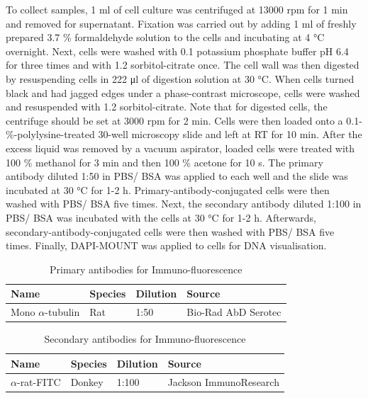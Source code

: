 To collect samples, 1 \si{\milli\litre} of cell culture was centrifuged at 13000 rpm for 1 \si{\minute} and removed for supernatant. Fixation was carried out by adding 1 \si{\milli\litre} of freshly prepared 3.7 \% formaldehyde solution to the cells and incubating at 4 \si{\celsius} overnight. Next, cells were washed with 0.1 \si{\Molar} potassium phosphate buffer pH 6.4 for three times and with 1.2 \si{\Molar} sorbitol-citrate once. The cell wall was then digested by resuspending cells in 222 \si{\micro\litre} of digestion solution at 30 \si{\celsius}. When cells turned black and had jagged edges under a phase-contrast microscope, cells were washed and resuspended with 1.2 \si{\Molar} sorbitol-citrate. Note that for digested cells, the centrifuge should be set at 3000 rpm for 2 \si{\minute}. Cells were then loaded onto a 0.1-\%-polylysine-treated 30-well microscopy slide and left at RT for 10 \si{\minute}. After the excess liquid was removed by a vacuum aspirator, loaded cells were treated with 100 \% methanol for 3 \si{\minute} and then 100 \% acetone for 10 \si{\second}. The primary antibody diluted 1:50 in PBS/ BSA was applied to each well and the slide was incubated at 30 \si{\celsius} for 1-2 \si{\hour}. Primary-antibody-conjugated cells were then washed with PBS/ BSA five times. Next, the secondary antibody diluted 1:100 in PBS/ BSA was incubated with the cells at 30 \si{\celsius} for 1-2 \si{\hour}. Afterwards, secondary-antibody-conjugated cells were then washed with PBS/ BSA five times. Finally, DAPI-MOUNT was applied to cells for DNA visualisation. 

\begin{table}[htbp]
\centering
\caption{Primary antibodies for Immuno-fluorescence}
\label{tab:1stabIF}
\begin{tabular}{llll}
\hline
\textbf{Name} & \textbf{Species} & \textbf{Dilution} & \textbf{Source} \\ \hline
Mono $\alpha$-tubulin & Rat & 1:50 & Bio-Rad AbD Serotec \\   
\end{tabular}
\end{table}

\begin{table}[htbp]
\centering
\caption{Secondary antibodies for Immuno-fluorescence}
\label{tab:2ndabIF}
\begin{tabular}{llll}
\hline
\textbf{Name} & \textbf{Species} & \textbf{Dilution} & \textbf{Source} \\ \hline
$\alpha$-rat-FITC & Donkey & 1:100 & Jackson ImmunoResearch \\   
\end{tabular}
\end{table}

